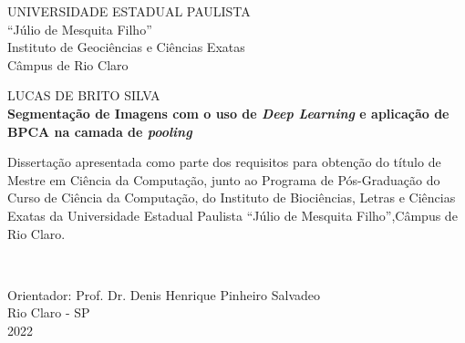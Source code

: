 \newpage
\thispagestyle{empty}

\begin{center}
    UNIVERSIDADE ESTADUAL PAULISTA\\
    “Júlio de Mesquita Filho”\\
    Instituto de Geociências e Ciências Exatas\\
    Câmpus de Rio Claro
    
    \vspace{2cm}
    {LUCAS DE BRITO SILVA\\}
    \vspace{2cm}
    \textbf{Segmentação de Imagens com o uso de \textit{Deep Learning} e aplicação de BPCA na camada de \textit{pooling}}
    
    \vspace{4cm}
    
    \hspace{.45\linewidth}
    \begin{minipage}{.50\linewidth}
    \small
        Dissertação apresentada como parte dos requisitos para obtenção do título de Mestre em Ciência da Computação, junto ao Programa de Pós-Graduação do Curso de Ciência da Computação, do Instituto de Biociências, Letras e Ciências Exatas da Universidade Estadual Paulista “Júlio de Mesquita Filho”,Câmpus de Rio Claro.
    \end{minipage} \\
    
    \vspace{1cm}

    Orientador: Prof. Dr. Denis Henrique Pinheiro Salvadeo\\
    
    \vfill
    \normalsize
    Rio Claro - SP \\
    2022
\end{center}